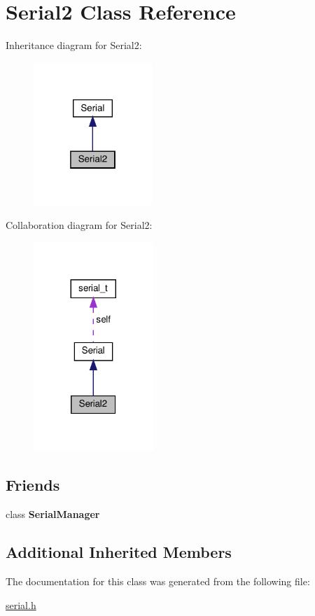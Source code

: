 \hypertarget{classSerial2}{}\section{Serial2 Class Reference}
\label{classSerial2}


Inheritance diagram for Serial2\+:\nopagebreak
\begin{figure}[H]
\begin{center}
\leavevmode
\includegraphics[width=127pt]{classSerial2__inherit__graph}
\end{center}
\end{figure}


Collaboration diagram for Serial2\+:\nopagebreak
\begin{figure}[H]
\begin{center}
\leavevmode
\includegraphics[width=128pt]{classSerial2__coll__graph}
\end{center}
\end{figure}
\subsection*{Friends}
\begin{DoxyCompactItemize}
\item 
\mbox{\label{classSerial2_ae711712f6bc003a5d1156a409a19941b}} 
class {\bfseries Serial\+Manager}
\end{DoxyCompactItemize}
\subsection*{Additional Inherited Members}


The documentation for this class was generated from the following file\+:\begin{DoxyCompactItemize}
\item 
\hyperlink{serial_8h}{serial.\+h}\end{DoxyCompactItemize}
